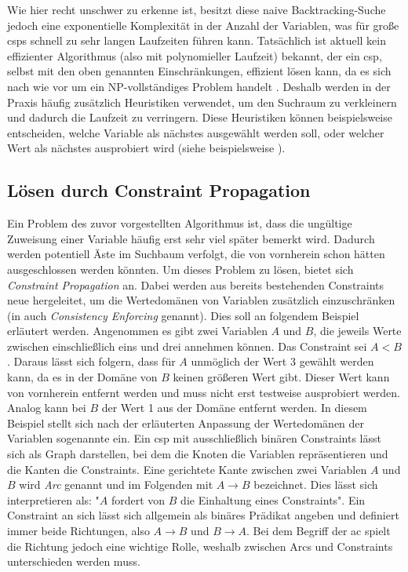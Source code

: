 Wie hier recht unschwer zu erkenne ist, besitzt diese naive Backtracking-Suche jedoch eine exponentielle Komplexität in der Anzahl der Variablen,
was für große \acp*{csp} schnell zu sehr langen Laufzeiten führen kann. Tatsächlich ist aktuell kein effizienter Algorithmus (also mit polynomieller Laufzeit) bekannt, der ein
\ac*{csp}, selbst mit den oben genannten Einschränkungen, effizient lösen kann, da es sich nach wie vor um ein NP-vollständiges Problem handelt \cite{BestCSPSearch}. Deshalb
werden in der Praxis häufig zusätzlich Heuristiken verwendet, um den Suchraum zu verkleinern und dadurch die Laufzeit zu verringern. Diese Heuristiken können beispielsweise
entscheiden, welche Variable als nächstes ausgewählt werden soll, oder welcher Wert als nächstes ausprobiert wird (siehe beispielsweise \cite{OrderingHeuristics}).

\subsection{Lösen durch Constraint Propagation}
\label{sec:ConstrProp}
Ein Problem des zuvor vorgestellten Algorithmus ist, dass die ungültige Zuweisung einer Variable häufig erst sehr viel später bemerkt wird. Dadurch werden potentiell Äste im
Suchbaum verfolgt, die von vornherein schon hätten ausgeschlossen werden könnten. Um dieses Problem zu lösen, bietet sich \textit{Constraint Propagation} an. Dabei werden
aus bereits bestehenden Constraints neue hergeleitet, um die Wertedomänen von Variablen zusätzlich einzuschränken (in \cite{OrderingHeuristics} auch \textit{Consistency
Enforcing} genannt). Dies soll an folgendem Beispiel erläutert werden. Angenommen es gibt zwei Variablen $A$ und $B$, die jeweils Werte zwischen einschließlich eins und drei
annehmen können. Das Constraint sei $A < B$. Daraus lässt sich folgern, dass für $A$ unmöglich der Wert 3 gewählt werden kann, da es in der Domäne von $B$ keinen größeren
Wert gibt. Dieser Wert kann von vornherein entfernt werden und muss nicht erst testweise ausprobiert werden. Analog kann bei $B$ der Wert 1 aus der Domäne entfernt werden. In
diesem Beispiel stellt sich nach der erläuterten Anpassung der Wertedomänen der Variablen sogenannte  ein. Ein \ac*{csp} mit ausschließlich binären Constraints lässt 
sich als Graph darstellen, bei dem die Knoten die Variablen repräsentieren und die Kanten die Constraints. Eine gerichtete Kante zwischen zwei Variablen $A$ und $B$ wird 
\textit{Arc} genannt und im Folgenden mit $A \rightarrow B$ bezeichnet. Dies lässt sich interpretieren als: "$A$ fordert von $B$ die Einhaltung eines Constraints". Ein
Constraint an sich lässt sich allgemein als binäres Prädikat angeben und definiert immer beide Richtungen, also $A \rightarrow B$ und $B \rightarrow A$. Bei dem Begriff
der \acl*{ac} spielt die Richtung jedoch eine wichtige Rolle, weshalb zwischen Arcs und Constraints unterschieden werden muss.


